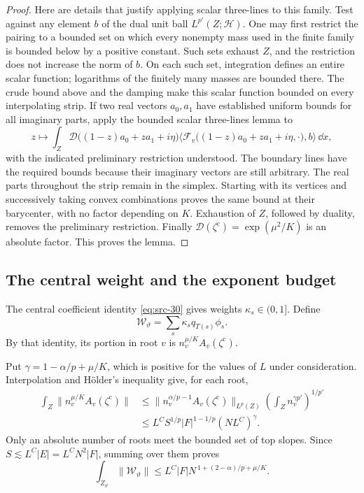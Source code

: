 \begin{proof}
Here are details that justify applying scalar three-lines to this
family.  Test against any element \(b\) of the dual unit ball
\(L^{p'}(Z;\mathcal H)\).  One may first restrict the pairing to a
bounded set on which every nonempty mass used in the finite family is
bounded below by a positive constant.  Such sets exhaust \(Z\), and
the restriction does not increase the norm of \(b\).  On each such
set, integration defines an entire scalar function; logarithms of the
finitely many masses are bounded there.  The crude bound above and the
damping make this scalar function bounded on every interpolating
strip.  If two real vectors \(a_0,a_1\) have established uniform
bounds for all imaginary parts, apply the bounded scalar three-lines
lemma \cite[Lemma~3.3, p.~57]{Hajlasz2012} to
\[
 z\longmapsto
 \int_Z
  \mathcal D\big((1-z)a_0+za_1+i\eta\big)
  \big\langle
   \mathcal F_v\big((1-z)a_0+za_1+i\eta,\cdot\big),b
  \big\rangle\,\dd x,
\]
with the indicated preliminary restriction understood.  The boundary
lines have the required bounds because their imaginary vectors are
still arbitrary.  The real parts throughout the strip remain in the
simplex.  Starting with its vertices and successively taking convex
combinations proves the same bound at their barycenter, with no
factor depending on \(K\).  Exhaustion of \(Z\), followed by duality,
removes the preliminary restriction.  Finally
\(\mathcal D(\zeta^{\mathrm c})=\exp(\mu^2/K)\) is an absolute
factor.  This proves the lemma.
\end{proof}

\subsection{The central weight and the exponent budget}

The central coefficient identity \eqref{eq:src-30} gives weights
\(\kappa_s\in(0,1]\).  Define
\[
 \mathcal W_\vartheta
       =\sum_s\kappa_s q_{T(s)}\phi_s.
\]
By that identity, its portion in root \(v\) is
\(n_v^{\mu/K}A_v(\zeta^{\mathrm c})\).

Put \(\gamma=1-\alpha/p+\mu/K\), which is positive for the values
of \(L\) under consideration.  Interpolation and H\"older's
inequality give, for each root,
\begin{align*}
 \int_Z\big\|n_v^{\mu/K}A_v(\zeta^{\mathrm c})\big\|
 &\le
  \|n_v^{\alpha/p-1}A_v(\zeta^{\mathrm c})\|_{L^p(Z)}
  \left(\int_Z n_v^{\gamma p'}\right)^{1/p'}\\
 &\le L^C S^{1/p}|F|^{1-1/p}(NL^C)^\gamma.
\end{align*}
Only an absolute number of roots meet the bounded set of top slopes.
Since \(S\lesssim L^C|E|=L^C N^2|F|\), summing over them proves
\begin{equation}\label{assembly:central-estimate}
 \int_{Z_\vartheta}\|\mathcal W_\vartheta\|
       \le L^C|F|N^{\,1+(2-\alpha)/p+\mu/K}.
\end{equation}

